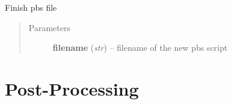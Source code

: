 \documentclass[letterpaper,10pt,english]{sphinxmanual}
\begin{document}

\begin{fulllineitems}
\label{CC3DPipeline:CC3DPipeline.finishPBS}
Finish pbs file
\begin{quote}\begin{description}
\item[{Parameters}] \leavevmode
\textbf{filename} (\emph{str}) -- filename of the new pbs script

\end{description}\end{quote}

\end{fulllineitems}



\section{Post-Processing}
\label{CC3DPipeline:post-processing}
\end{document}
